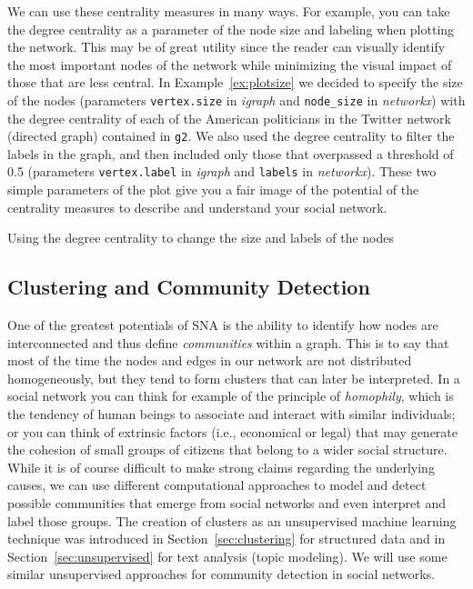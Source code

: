 
We can use these centrality measures in many ways. For example, you can take the degree centrality as a parameter of the node size and labeling when plotting the network. This may be of great utility since the reader can visually identify the most important nodes of the network while minimizing the visual impact of those that are less central. In Example~\ref{ex:plotsize} we decided to specify the size of the nodes (parameters \verb|vertex.size| in \emph{igraph} and \verb|node_size| in \emph{networkx}) with the degree centrality of each of the American politicians in the Twitter network (directed graph) contained in \texttt{g2}. We also used the degree centrality to filter the labels in the graph, and then included only those that overpassed a threshold of 0.5 (parameters \verb|vertex.label| in \emph{igraph} and \verb|labels| in \emph{networkx}). These two simple parameters of the plot give you a fair image of the potential of the centrality measures to describe and understand your social network.

\begin{ccsexample}
  \caption{Using the degree centrality to change the size and labels of the nodes}
  \label{ex:plotsize}
\end{ccsexample}

\subsection{Clustering and Community Detection}

One of the greatest potentials of SNA is the ability to identify how nodes are interconnected and thus define \emph{communities} within a graph. This is to say that most of the time the nodes and edges in our network are not distributed homogeneously, but they tend to form clusters that can  later be interpreted. In a social network you can think for example of the principle of \emph{homophily}, which is the tendency of human beings to associate and interact with similar individuals; or you can think of extrinsic factors (i.e., economical or legal) that may generate the cohesion of small groups of citizens that belong to a wider social structure. While it is of course difficult to make strong claims regarding the underlying causes, we can use different computational approaches to model and detect possible communities that emerge from social networks and even interpret and label those groups. The creation of clusters as an unsupervised machine learning technique was introduced in Section~\ref{sec:clustering} for structured data and in Section~\ref{sec:unsupervised} for text analysis (topic modeling). We will use some similar unsupervised approaches for community detection in social networks.

